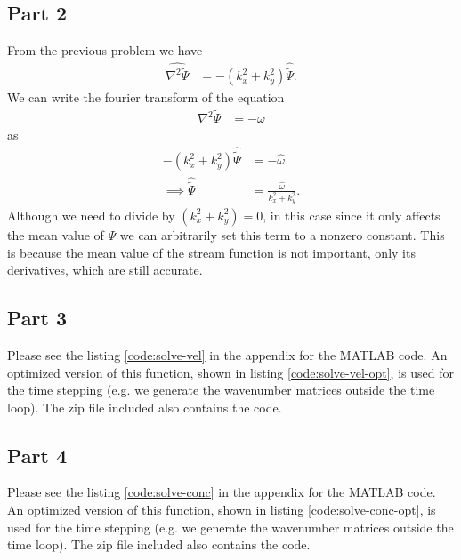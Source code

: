 \documentclass{article}
\begin{document}
\subsection{Part 2}
From the previous problem we have
\begin{align}
    \widehat{\nabla^2 \tilde{\Psi}} &= -(k^2_x + k^2_y) \hat{\tilde{\Psi}}.
\end{align}
We can write the fourier transform of the equation
\begin{align}
    \nabla^2 \tilde{\Psi} &= -\omega
\end{align}
as
\begin{align}
    -(k^2_x + k^2_y) \hat{\tilde{\Psi}} &= -\hat{\omega} \\
\implies \hat{\tilde{\Psi}} &= \frac{\hat{\omega}}{k^2_x + k^2_y}.
\end{align}
Although we need to divide by $(k^2_x + k^2_y) = 0$, in this case since it only affects the mean value of $\Psi$ we can arbitrarily set this term to a nonzero constant.
This is because the mean value of the stream function is not important, only its derivatives, which are still accurate.

\subsection{Part 3}
Please see the listing \ref{code:solve-vel} in the appendix for the MATLAB code.
An optimized version of this function, shown in listing \ref{code:solve-vel-opt}, is used for the time stepping (e.g. we generate the wavenumber matrices outside the time loop).
The zip file included also contains the code.

\subsection{Part 4}
Please see the listing \ref{code:solve-conc} in the appendix for the MATLAB code.
An optimized version of this function, shown in listing \ref{code:solve-conc-opt}, is used for the time stepping (e.g. we generate the wavenumber matrices outside the time loop).
The zip file included also contains the code.
\end{document}
